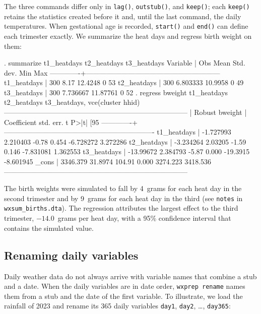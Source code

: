 \noindent The three commands differ only in \texttt{lag()}, \texttt{outstub()}, and \texttt{keep()}; each \texttt{keep()} retains the statistics created before it and, until the last command, the daily temperatures. When gestational age is recorded, \texttt{start()} and \texttt{end()} can define each trimester exactly. We summarize the heat days and regress birth weight on them:

\begin{stlog}
. summarize t1_heatdays t2_heatdays t3_heatdays
{\smallskip}
    Variable |        Obs        Mean    Std. dev.       Min        Max
-------------+---------------------------------------------------------
 t1_heatdays |        300        8.17     12.4248          0         53
 t2_heatdays |        300    6.803333     10.9958          0         49
 t3_heatdays |        300    7.736667    11.87761          0         52
{\smallskip}
. regress bweight t1_heatdays t2_heatdays t3_heatdays, vce(cluster hhid)
{\smallskip}
\oom
{\smallskip}
------------------------------------------------------------------------------
             |               Robust
     bweight | Coefficient  std. err.      t    P>|t|     [95%
-------------+----------------------------------------------------------------
 t1_heatdays |  -1.727993   2.210403    -0.78   0.454    -6.728272    3.272286
 t2_heatdays |  -3.234264    2.03205    -1.59   0.146    -7.831081    1.362553
 t3_heatdays |  -13.99672   2.384793    -5.87   0.000     -19.3915   -8.601945
       _cons |   3346.379    31.8974   104.91   0.000     3274.223    3418.536
------------------------------------------------------------------------------
\end{stlog}

\noindent The birth weights were simulated to fall by 4~grams for each heat day in the second trimester and by 9~grams for each heat day in the third (see \texttt{notes} in \texttt{wxsum\_births.dta}). The regression attributes the largest effect to the third trimester, $-14.0$~grams per heat day, with a 95\% confidence interval that contains the simulated value.

\subsection{Renaming daily variables} \label{sec:ex-rename}

Daily weather data do not always arrive with variable names that combine a stub and a date. When the daily variables are in date order, \texttt{wxprep rename} names them from a stub and the date of the first variable. To illustrate, we load the rainfall of 2023 and rename its 365 daily variables \texttt{day1}, \texttt{day2}, \ldots, \texttt{day365}:

